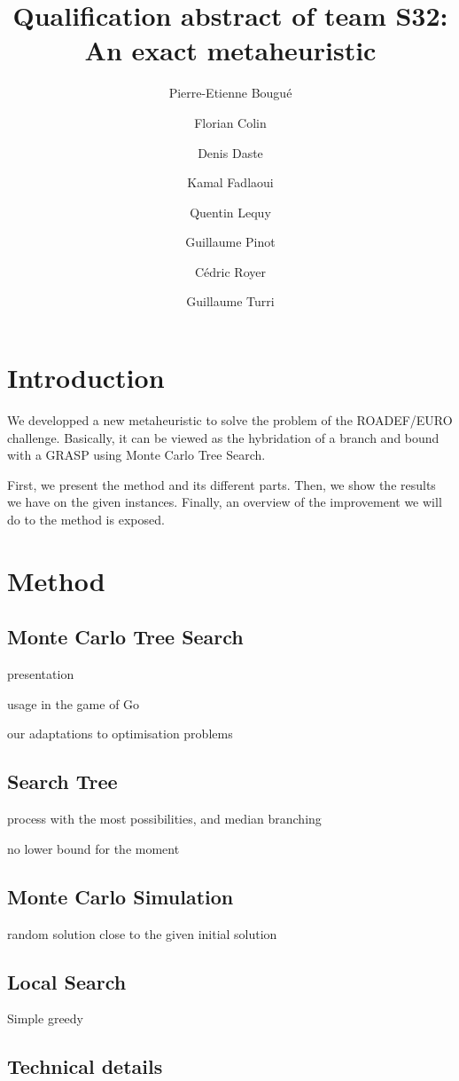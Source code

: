 \documentclass[a4paper,twocolumn]{article}
\title{Qualification abstract of team S32:\\
  An exact metaheuristic}
\author{Pierre-Etienne Bougué \and Florian Colin \and Denis Daste
  \and Kamal Fadlaoui \and Quentin Lequy \and Guillaume Pinot \and
  Cédric Royer \and Guillaume Turri}
\begin{document}
\maketitle

\section{Introduction}

We developped a new metaheuristic to solve the problem of the
ROADEF/EURO challenge.  Basically, it can be viewed as the hybridation
of a branch and bound with a GRASP using Monte Carlo Tree Search.

First, we present the method and its different parts.  Then, we show
the results we have on the given instances. Finally, an overview of
the improvement we will do to the method is exposed.

\section{Method}

\subsection{Monte Carlo Tree Search}

presentation

usage in the game of Go

our adaptations to optimisation problems

\subsection{Search Tree}

process with the most possibilities, and median branching

no lower bound for the moment

\subsection{Monte Carlo Simulation}

random solution close to the given initial solution

\subsection{Local Search}

Simple greedy

\subsection{Technical details}
\end{document}
